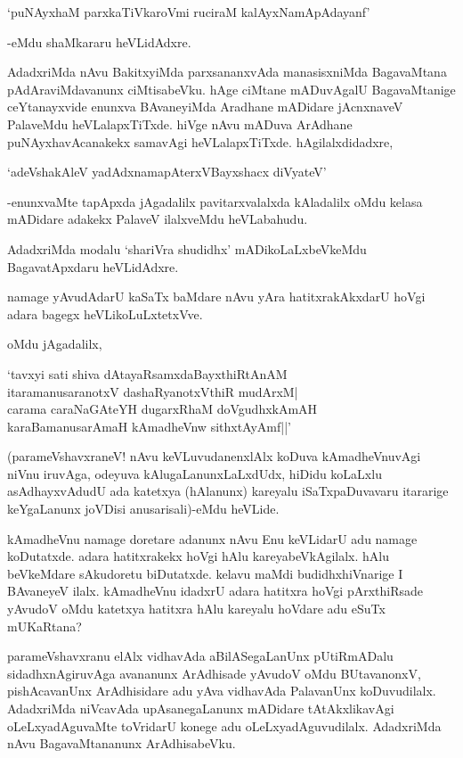 \begin{shloka}
`puNAyxhaM parxkaTiVkaroVmi ruciraM kalAyxNamApAdayanf'
\end{shloka}

-eMdu shaMkararu heVLidAdxre.

AdadxriMda nAvu BakitxyiMda parxsananxvAda manasisxniMda BagavaMtana pAdAraviMdavanunx ciMtisabeVku. hAge ciMtane mADuvAgalU BagavaMtanige ceYtanayxvide enunxva BAvaneyiMda Aradhane mADidare jAcnxnaveV PalaveMdu heVLalapxTiTxde. hiVge nAvu mADuva ArAdhane puNAyxhavAcanakekx samavAgi heVLalapxTiTxde. hAgilalxdidadxre,

\begin{shloka}
`adeVshakAleV yadAdxnamapAterxVBayxshacx diVyateV'
\end{shloka}

-enunxvaMte tapApxda jAgadalilx pavitarxvalalxda kAladalilx oMdu kelasa mADidare adakekx PalaveV ilalxveMdu heVLabahudu.

AdadxriMda modalu `shariVra shudidhx' mADikoLaLxbeVkeMdu BagavatApxdaru heVLidAdxre.

namage yAvudAdarU kaSaTx baMdare nAvu yAra hatitxrakAkxdarU hoVgi adara bagegx heVLikoLuLxtetxVve.

oMdu jAgadalilx, 

\begin{shloka}
`tavxyi sati shiva dAtayaRsamxdaBayxthiRtAnAM\\
itaramanusaranotxV dashaRyanotxVthiR mudArxM|\\
carama caraNaGAteYH dugarxRhaM doVgudhxkAmAH\\
karaBamanusarAmaH kAmadheVnw sithxtAyAmf||'
\end{shloka}

(parameVshavxraneV! nAvu keVLuvudanenxlAlx koDuva kAmadheVnuvAgi niVnu iruvAga, odeyuva kAlugaLanunxLaLxdUdx, hiDidu koLaLxlu asAdhayxvAdudU ada katetxya (hAlanunx) kareyalu iSaTxpaDuvavaru itararige keYgaLanunx joVDisi anusarisali)-eMdu heVLide.

kAmadheVnu namage doretare adanunx nAvu Enu keVLidarU adu namage koDutatxde. adara hatitxrakekx hoVgi hAlu kareyabeVkAgilalx. hAlu beVkeMdare sAkudoretu biDutatxde. kelavu maMdi budidhxhiVnarige I BAvaneyeV ilalx. kAmadheVnu idadxrU adara hatitxra hoVgi pArxthiRsade yAvudoV oMdu katetxya hatitxra hAlu kareyalu hoVdare adu eSuTx mUKaRtana? 

parameVshavxranu elAlx vidhavAda aBilASegaLanUnx pUtiRmADalu sidadhxnAgiruvAga avananunx ArAdhisade yAvudoV oMdu BUtavanonxV, pishAcavanUnx ArAdhisidare adu yAva vidhavAda PalavanUnx koDuvudilalx. AdadxriMda niVcavAda upAsanegaLanunx mADidare tAtAkxlikavAgi oLeLxyadAguvaMte toVridarU konege adu oLeLxyadAguvudilalx. AdadxriMda nAvu BagavaMtananunx ArAdhisabeVku.

